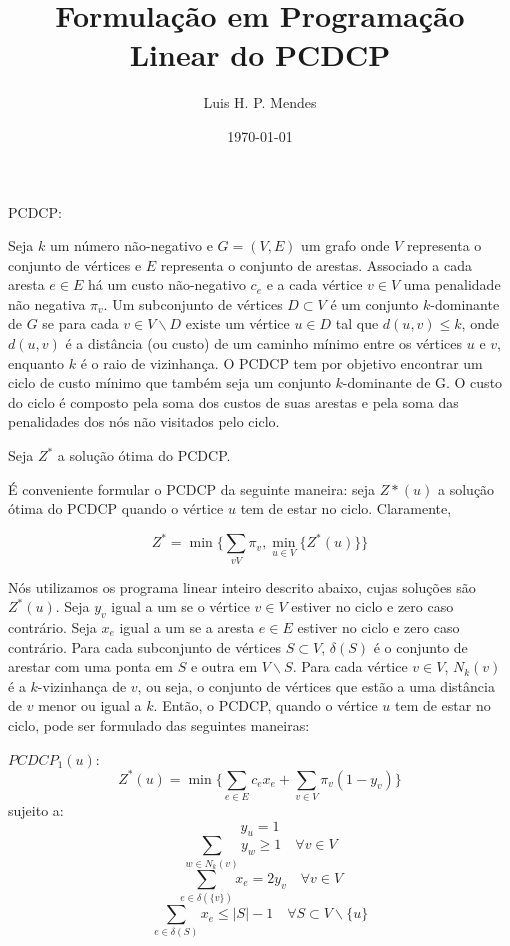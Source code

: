 \documentclass{article}
\title{ Formulação em Programação Linear do PCDCP }
\date{\today}
\author{Luis H. P. Mendes}
\begin{document}
	\maketitle
	
	PCDCP:
	
	Seja $k$ um número não-negativo e $G = (V, E)$ um grafo onde $V$ representa o conjunto de vértices e $E$ representa o conjunto de arestas.
	Associado a cada aresta $e \in E$ há um custo não-negativo $c_{e}$ e a cada vértice $v \in V$ uma penalidade não negativa $\pi_{v}$.
	Um subconjunto de vértices $D \subset V$ é um conjunto $k$-dominante de $G$ se para cada $v \in V \backslash D$ existe um vértice $u \in D$ tal que $d(u, v) \leq k$, onde $d(u, v)$ é a distância (ou custo) de um caminho mínimo entre os vértices $u$ e $v$, enquanto $k$ é o raio de vizinhança.
	O PCDCP tem por objetivo encontrar um ciclo de custo mínimo que também seja um conjunto $k$-dominante de G.
	O custo do ciclo é composto pela soma dos custos de suas arestas e pela soma das penalidades dos nós não visitados pelo ciclo.
	
	Seja $Z^*$ a solução ótima do PCDCP.
	
	É conveniente formular o PCDCP da seguinte maneira: seja $Z*(u)$ a solução ótima do PCDCP quando o vértice $u$ tem de estar no ciclo. Claramente,
	
	\begin{equation}
		Z^* = \min \Bigg\{ \sum_{v  V} \pi_v , \min_{u \in V} \Big\{ Z^*(u) \Big\}  \Bigg\}
	\end{equation}
	
	Nós utilizamos os programa linear inteiro descrito abaixo, cujas soluções são $Z^*(u)$. Seja $y_v$ igual a um se o vértice $v \in V$ estiver no ciclo e zero caso contrário.
	Seja $x_e$ igual a um se a aresta $e \in E$ estiver no ciclo e zero caso contrário. Para cada subconjunto de vértices $S \subset V$, $\delta(S)$ é o conjunto de arestar com uma ponta em $S$ e outra em $V \backslash S$.
	Para cada vértice $v \in V$, $N_k(v)$ é a $k$-vizinhança de $v$, ou seja, o conjunto de vértices que estão a uma distância de $v$ menor ou igual a $k$.
	Então, o PCDCP, quando o vértice $u$ tem de estar no ciclo, pode ser formulado das seguintes maneiras:

	$PCDCP_1(u)$:
	\begin{equation}
		Z^*(u) = \min \Bigg\{ \sum_{e \in E} c_e x_e + \sum_{v \in V} \pi_v (1 - y_v) \Bigg\}
	\end{equation}
	sujeito a:
	\begin{equation}
		y_u = 1
	\end{equation}
	\begin{equation}
		\sum_{w \in N_k(v)} y_w \geq 1 \quad \forall v \in V
	\end{equation}
	\begin{equation}
		\sum_{e \in \delta(\{v\})} x_e = 2y_v \quad \forall v \in V
	\end{equation}
	\begin{equation}
		\sum_{e \in \delta(S)} x_e \leq |S| - 1 \quad \forall S \subset V \backslash \{ u \}
	\end{equation}
	
\end{document}

